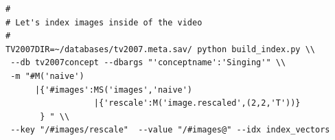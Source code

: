 \documentclass{report}
\begin{document}
\begin{lstlisting}
#
# Let's index images inside of the video 
#
TV2007DIR=~/databases/tv2007.meta.sav/ python build_index.py \\
 --db tv2007concept --dbargs "'conceptname':'Singing'" \\
 -m "#M('naive')
      |{'#images':MS('images','naive')
                  |{'rescale':M('image.rescaled',(2,2,'T'))}
       } " \\
 --key "/#images/rescale"  --value "/#images@" --idx index_vectors

\end{lstlisting}
\end{document}
